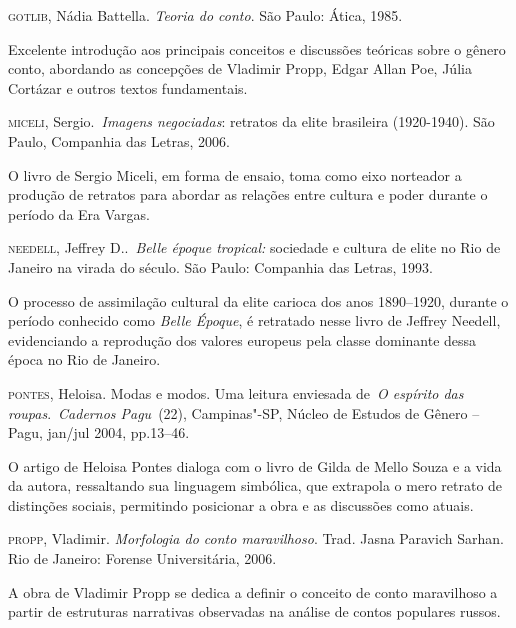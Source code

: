 \documentclass[12pt]{extarticle}
\begin{document}
\textsc{gotlib}, Nádia Battella. \emph{Teoria do conto}. São Paulo: Ática,
1985. 

Excelente introdução aos principais conceitos e discussões
teóricas sobre o gênero conto, abordando as concepções de Vladimir
Propp, Edgar Allan Poe, Júlia Cortázar e outros textos fundamentais.

\textsc{miceli}, Sergio.~\textit{Imagens negociadas}: retratos da elite
brasileira (1920-1940). São Paulo, Companhia das Letras, 2006.

O livro de Sergio Miceli, em forma de ensaio, toma como eixo norteador a produção de 
retratos para abordar as relações entre cultura e poder durante o período da Era Vargas.

\textsc{needell}, Jeffrey D..~\emph{Belle époque tropical:} sociedade
e cultura de elite no Rio de Janeiro na virada do século. São
Paulo: Companhia das Letras, 1993.

O processo de assimilação cultural da elite carioca dos anos 1890--1920, durante o 
período conhecido como \textit{Belle Époque}, é retratado nesse livro de Jeffrey Needell, evidenciando 
a reprodução dos valores europeus pela classe dominante dessa época no Rio de Janeiro.

\textsc{pontes}, Heloisa. Modas e modos. Uma leitura enviesada de~\emph{O
espírito das roupas}.~\textit{Cadernos Pagu}~(22), Campinas"-SP, Núcleo
de Estudos de Gênero -- Pagu, jan/jul 2004, pp.13--46.

O artigo de Heloisa Pontes dialoga com o livro de Gilda de Mello Souza e  
a vida da autora, ressaltando sua linguagem simbólica, que extrapola 
o mero retrato de distinções sociais, permitindo posicionar a obra e as discussões 
como atuais. 

\textsc{propp}, Vladimir. \emph{Morfologia do conto maravilhoso}. Trad. Jasna
Paravich Sarhan. Rio de Janeiro: Forense Universitária, 2006. 

A obra de Vladimir Propp se dedica a definir o conceito de conto maravilhoso
a partir de estruturas narrativas observadas na análise de contos
populares russos.
\end{document}
